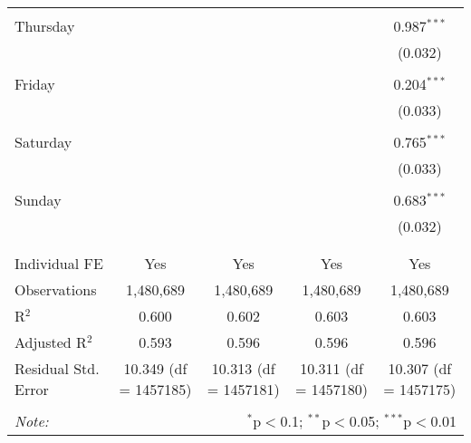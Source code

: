 \documentclass[
]{article}
\begin{document}
\begin{table}[!htbp]
{\begin{tabular}{@{\extracolsep{5pt}}lcccc}
  & & & & \\ 
 Thursday &  &  &  & 0.987$^{***}$ \\ 
  &  &  &  & (0.032) \\ 
  & & & & \\ 
 Friday &  &  &  & 0.204$^{***}$ \\ 
  &  &  &  & (0.033) \\ 
  & & & & \\ 
 Saturday &  &  &  & 0.765$^{***}$ \\ 
  &  &  &  & (0.033) \\ 
  & & & & \\ 
 Sunday &  &  &  & 0.683$^{***}$ \\ 
  &  &  &  & (0.032) \\ 
  & & & & \\ 
\hline \\[-1.8ex] 
Individual FE & Yes & Yes & Yes & Yes \\ 
Observations & 1,480,689 & 1,480,689 & 1,480,689 & 1,480,689 \\ 
R$^{2}$ & 0.600 & 0.602 & 0.603 & 0.603 \\ 
Adjusted R$^{2}$ & 0.593 & 0.596 & 0.596 & 0.596 \\ 
Residual Std. Error & 10.349 (df = 1457185) & 10.313 (df = 1457181) & 10.311 (df = 1457180) & 10.307 (df = 1457175) \\ 
\hline 
\hline \\[-1.8ex] 
\textit{Note:}  & \multicolumn{4}{r}{$^{*}$p$<$0.1; $^{**}$p$<$0.05; $^{***}$p$<$0.01} \\ 
\end{tabular}
} 
\end{table} 
\newpage
\end{document}
